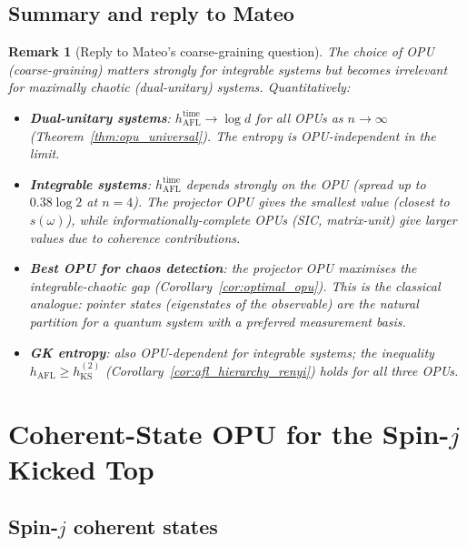 \documentclass[12pt,a4paper]{article}
\newtheorem{remark}[theorem]{Remark}
\begin{document}
\subsection{Summary and reply to Mateo}

\begin{remark}[Reply to Mateo's coarse-graining question]
The choice of OPU (coarse-graining) matters \emph{strongly} for integrable systems
but becomes irrelevant for maximally chaotic (dual-unitary) systems.
Quantitatively:
\begin{itemize}
\item \textbf{Dual-unitary systems}: $h_{\mathrm{AFL}}^{\mathrm{time}} \to \log d$
  for \emph{all} OPUs as $n\to\infty$ (Theorem~\ref{thm:opu_universal}).
  The entropy is OPU-independent in the limit.
\item \textbf{Integrable systems}: $h_{\mathrm{AFL}}^{\mathrm{time}}$ depends
  strongly on the OPU (spread up to $0.38\log 2$ at $n=4$).
  The projector OPU gives the smallest value (closest to $s(\omega)$), while
  informationally-complete OPUs (SIC, matrix-unit) give larger values due to
  coherence contributions.
\item \textbf{Best OPU for chaos detection}: the projector OPU maximises the
  integrable-chaotic gap (Corollary~\ref{cor:optimal_opu}).  This is the
  classical analogue: pointer states (eigenstates of the observable) are the
  natural partition for a quantum system with a preferred measurement basis.
\item \textbf{GK entropy}: also OPU-dependent for integrable systems; the
  inequality $h_{\mathrm{AFL}} \geq h_{\mathrm{KS}}^{(2)}$
  (Corollary~\ref{cor:afl_hierarchy_renyi}) holds for all three OPUs.
\end{itemize}
\end{remark}

\section{Coherent-State OPU for the Spin-$j$ Kicked Top}
\label{sec:cs_opu}

\subsection{Spin-$j$ coherent states}
\end{document}
